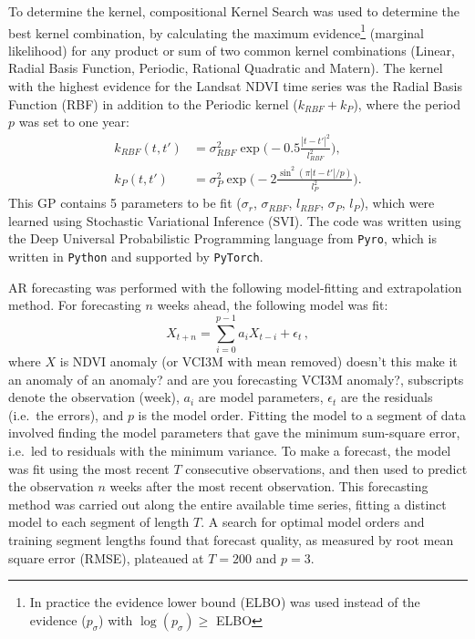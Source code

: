 \documentclass[review]{elsarticle}
\begin{document}
{\color{red}{\bf SEB HERE}} 


 To determine the kernel, compositional Kernel Search \citep{pmlr-v28-duvenaud13} was used to determine the best kernel combination, by calculating the maximum evidence\footnote{In practice the evidence lower bound (ELBO) was used instead of the evidence ($p_\sigma$) with $\log(p_\sigma) \ge$ ELBO} (marginal likelihood) for any product or sum of two common kernel combinations (Linear,  Radial Basis Function, Periodic, Rational Quadratic and Matern). The kernel with the highest evidence for the Landsat NDVI time series was the Radial Basis Function (RBF) in addition to the Periodic kernel ($k_{RBF}+k_P $), where the period $p$ was set to one year:
\begin{align}
	k_{RBF}(t,t') &= \sigma_{RBF}^2 \exp{\Big( -0.5 \frac{|t-t'|^2}{l_{RBF}^2} \Big) }, \label{eq:eqr} \\
	k_P(t,t') &=    \sigma_{P}^2 \exp{\Big(-2 \frac{\sin^2(\pi |t-t'|/p)}{l_{P}^2}\Big)}. \label{eq:eqP}
\end{align}
This GP contains 5 parameters to be fit ($\sigma_r$, $\sigma_{RBF}$, $l_{RBF}$, $\sigma_{P}$, $l_{P}$), which were learned using Stochastic Variational Inference (SVI). The code was written using the Deep Universal Probabilistic Programming language from \texttt{Pyro}, which is written in \texttt{Python} and supported by \texttt{PyTorch}.


AR forecasting was performed with the following model-fitting and extrapolation method. For forecasting $n$ weeks ahead, the following model was fit:
\begin{equation}
X_{t+n}=\sum_{i=0}^{p-1}a_iX_{t-i}+\epsilon_t\,, \label{eq:AR1}
\end{equation}
where $X$ is NDVI anomaly (or VCI3M with mean removed) {\color{green} doesn't this make it an anomaly of an anomaly? and are you forecasting VCI3M anomaly?}, subscripts denote the observation (week), $a_i$ are model parameters, $\epsilon_t$ are the residuals (i.e.~the errors), and $p$ is the model order. Fitting the model to a segment of data involved finding the model parameters that gave the minimum sum-square error, i.e.~led to residuals with the minimum variance. To make a forecast, the model was fit using the most recent $T$ consecutive observations, and then used to predict the observation $n$ weeks after the most recent observation. This forecasting method was carried out along the entire available time series, fitting a distinct model to each segment of length $T$. A search for optimal model orders and training segment lengths found that forecast quality, as measured by root mean square error (RMSE), plateaued at $T=200$ and $p=3$.%
\end{document}
